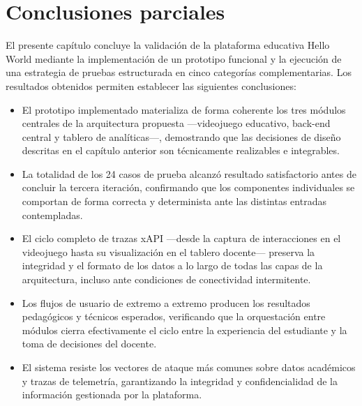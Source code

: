 \section{Conclusiones parciales}

El presente capítulo concluye la validación de la plataforma educativa Hello World mediante la implementación de un prototipo funcional y la ejecución de una estrategia de pruebas estructurada en cinco categorías complementarias. Los resultados obtenidos permiten establecer las siguientes conclusiones:

\begin{itemize}
	\item El prototipo implementado materializa de forma coherente los tres módulos centrales de la arquitectura propuesta —videojuego educativo, back-end central y tablero de analíticas—, demostrando que las decisiones de diseño descritas en el capítulo anterior son técnicamente realizables e integrables.
	
	\item La totalidad de los 24 casos de prueba alcanzó resultado satisfactorio antes de concluir la tercera iteración, confirmando que los componentes individuales se comportan de forma correcta y determinista ante las distintas entradas contempladas.
	
	\item El ciclo completo de trazas xAPI —desde la captura de interacciones en el videojuego hasta su visualización en el tablero docente— preserva la integridad y el formato de los datos a lo largo de todas las capas de la arquitectura, incluso ante condiciones de conectividad intermitente.
	
	\item Los flujos de usuario de extremo a extremo producen los resultados pedagógicos y técnicos esperados, verificando que la orquestación entre módulos cierra efectivamente el ciclo entre la experiencia del estudiante y la toma de decisiones del docente.
	
	\item El sistema resiste los vectores de ataque más comunes sobre datos académicos y trazas de telemetría, garantizando la integridad y confidencialidad de la información gestionada por la plataforma.
\end{itemize}
